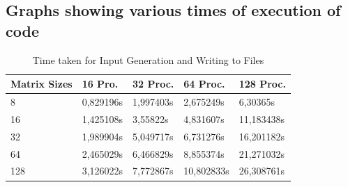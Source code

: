 \documentclass[11pt,conference]{IEEEtran}
\begin{document}
\onecolumn
\newpage




\onecolumn
\appendix
\setcounter{page}{1}
\setcounter{equation}{0}
\setcounter{figure}{0}
\setcounter{table}{0}
\setcounter{section}{0}
\setcounter{algorithm}{0}

\subsection{Graphs showing various times of execution of code}

\begin{table}[h!]
\centering
\caption{Time taken for Input Generation and Writing to Files}
\label{tab:my-table}
\begin{tabular}{|l|l|l|l|l|}
\hline
\textbf{Matrix Sizes} & \textbf{16 Pro.} & \textbf{32 Proc.} & \textbf{64 Proc.} & \textbf{128 Proc.} \\ \hline
8 & 0,829196s & 1,997403s & 2,675249s & 6,30365s \\ \hline
16 & 1,425108s & 3,55822s & 4,831607s & 11,183438s \\ \hline
32 & 1,989904s & 5,049717s & 6,731276s & 16,201182s \\ \hline
64 & 2,465029s & 6,466829s & 8,855374s & 21,271032s \\ \hline
128 & 3,126022s & 7,772867s & 10,802833s & 26,308761s \\ \hline
\end{tabular}
\end{table}

\begin{table}[h!]
\centering
\caption{Time taken for Transposition and Writing to Files}
\label{tab:my-table}
\end{table}
\end{document}
